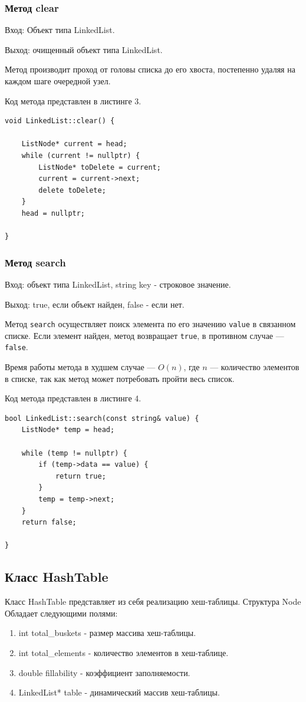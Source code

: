 \documentclass[11pt,a4paper,final]{article} %
\begin{document}
\subsubsection{Метод clear}
Вход: Объект типа LinkedList. \par
Выход: очищенный объект типа LinkedList. \par
Метод производит проход от головы списка до его хвоста, постепенно удаляя на каждом шаге очередной узел.\par
Код метода представлен в листинге 3.
\begin{lstlisting}[label=Linkedclear, caption = Метод clear]
void LinkedList::clear() {
	
	ListNode* current = head;
	while (current != nullptr) {
		ListNode* toDelete = current;
		current = current->next;
		delete toDelete; 
	}
	head = nullptr; 
	
}
\end{lstlisting}

\subsubsection{Метод search}
Вход: объект типа LinkedList, string key - строковое значение. \par
Выход: true, если объект найден, false - если нет. \par

\par Метод \texttt{search} осуществляет поиск элемента по его значению \texttt{value} в связанном списке. Если элемент найден, метод возвращает \texttt{true}, в противном случае — \texttt{false}.

\par Время работы метода в худшем случае — $O(n)$, где $n$ — количество элементов в списке, так как метод может потребовать пройти весь список.

Код метода представлен в листинге 4.
\begin{lstlisting}[label=Linkedclear, caption = Метод find]
bool LinkedList::search(const string& value) {
	ListNode* temp = head;
	
	while (temp != nullptr) {
		if (temp->data == value) {
			return true;
		}
		temp = temp->next;
	}
	return false;
	
}
\end{lstlisting}


\subsection{Класс HashTable}
Класс HashTable представляет из себя реализацию хеш-таблицы. Структура Node Обладает следующими полями:
\begin{enumerate}
	
	\item int total\_buskets - размер массива хеш-таблицы.
	\item int total\_elements - количество элементов в хеш-таблице.
	\item double fillability - коэффициент заполняемости.
	\item LinkedList* table - динамический массив хеш-таблицы.
	
\end{enumerate}
\end{document}
